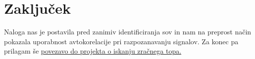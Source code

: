 \documentclass{article}
\begin{document}
\section{Zaključek}
Naloga nas je postavila pred zanimiv identificiranja sov in nam na preprost način pokazala uporabnost avtokorelacije pri razpozanavanju signalov. Za konec pa prilagam še \href{https://www.twobraids.com/2024/01/air-cannon.html}{povezavo do projekta o iskanju zračnega topa.}
\end{document}
